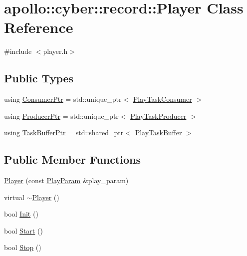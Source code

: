 \hypertarget{classapollo_1_1cyber_1_1record_1_1Player}{\section{apollo\-:\-:cyber\-:\-:record\-:\-:Player Class Reference}
\label{classapollo_1_1cyber_1_1record_1_1Player}
}


{\ttfamily \#include $<$player.\-h$>$}

\subsection*{Public Types}
\begin{DoxyCompactItemize}
\item 
using \hyperlink{classapollo_1_1cyber_1_1record_1_1Player_a37e1db52ec97f2d722a96728ee34eca4}{Consumer\-Ptr} = std\-::unique\-\_\-ptr$<$ \hyperlink{classapollo_1_1cyber_1_1record_1_1PlayTaskConsumer}{Play\-Task\-Consumer} $>$
\item 
using \hyperlink{classapollo_1_1cyber_1_1record_1_1Player_acc295a5b34f4d9286c0e5abdb19708cc}{Producer\-Ptr} = std\-::unique\-\_\-ptr$<$ \hyperlink{classapollo_1_1cyber_1_1record_1_1PlayTaskProducer}{Play\-Task\-Producer} $>$
\item 
using \hyperlink{classapollo_1_1cyber_1_1record_1_1Player_ab31c13eb2f49c83db3e5ab2241e4a649}{Task\-Buffer\-Ptr} = std\-::shared\-\_\-ptr$<$ \hyperlink{classapollo_1_1cyber_1_1record_1_1PlayTaskBuffer}{Play\-Task\-Buffer} $>$
\end{DoxyCompactItemize}
\subsection*{Public Member Functions}
\begin{DoxyCompactItemize}
\item 
\hyperlink{classapollo_1_1cyber_1_1record_1_1Player_ab89e817d3d8512bcf9762af369b02672}{Player} (const \hyperlink{structapollo_1_1cyber_1_1record_1_1PlayParam}{Play\-Param} \&play\-\_\-param)
\item 
virtual \hyperlink{classapollo_1_1cyber_1_1record_1_1Player_ae1e86522775d303fdba52ea7ff34705d}{$\sim$\-Player} ()
\item 
bool \hyperlink{classapollo_1_1cyber_1_1record_1_1Player_adfbffc4391f36a9cec88f8acba8aa141}{Init} ()
\item 
bool \hyperlink{classapollo_1_1cyber_1_1record_1_1Player_a1b61426aa2b2e3a2df4062fbf82950bc}{Start} ()
\item 
bool \hyperlink{classapollo_1_1cyber_1_1record_1_1Player_a9ef25420e7c353ba933b12eeacab67c0}{Stop} ()
\end{DoxyCompactItemize}
